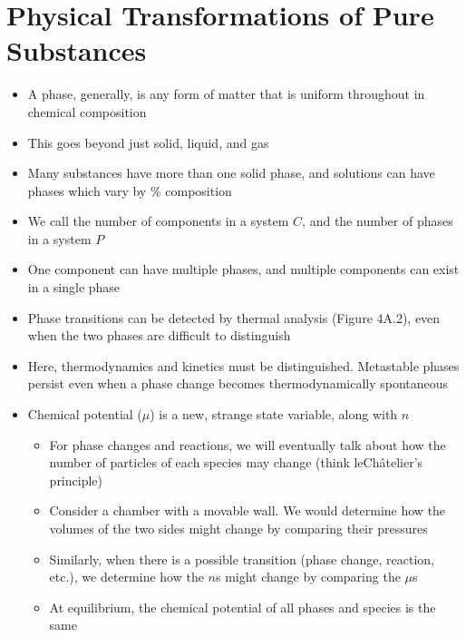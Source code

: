 \documentclass[12pt, openany, letterpaper]{memoir}
\begin{document}
\chapter{Physical Transformations of Pure Substances}
\begin{itemize}
	\item A phase, generally, is any form of matter that is uniform throughout in chemical composition
	\item This goes beyond just solid, liquid, and gas
	\item Many substances have more than one solid phase, and solutions can have phases which vary by \% composition
	\item We call the number of components in a system $C$, and the number of phases in a system $P$
	\item One component can have multiple phases, and multiple components can exist in a single phase
	\item Phase transitions can be detected by thermal analysis (Figure 4A.2), even when the two phases are difficult to distinguish
	\item Here, thermodynamics and kinetics must be distinguished. Metastable phases persist even when a phase change becomes thermodynamically spontaneous
	\item Chemical potential ($\mu$) is a new, strange state variable, along with $n$
	      \begin{itemize}
		      \item For phase changes and reactions, we will eventually talk about how the number of particles of each species may change (think leCh\^{a}telier's principle)
		      \item Consider a chamber with a movable wall. We would determine how the volumes of the two sides might change by comparing their pressures
		      \item Similarly, when there is a possible transition (phase change, reaction, etc.), we determine how the $n$s might change by comparing the $\mu$s
		      \item At equilibrium, the chemical potential of all phases and species is the same
	      \end{itemize}
\end{itemize}
\end{document}
